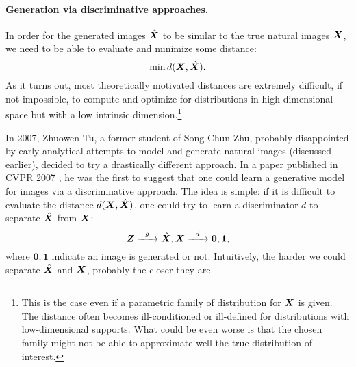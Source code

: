 \documentclass[\toplevelprefix/book-main.tex]{subfiles}
\begin{document}
\paragraph{Generation via discriminative approaches.}
In order for the generated images $\hat {\bm{X}}$ to be similar to the true natural images $\bm{X}$, we need to be able to evaluate and minimize some distance:
\begin{equation}
    \min d(\bm{X}, \hat {\bm{X}}).
\end{equation}
As it turns out, most theoretically motivated  distances are extremely difficult, if not impossible, to compute and optimize for distributions in high-dimensional space but with a low intrinsic dimension.\footnote{This is the case even if a parametric family of distribution for $\bm{X}$ is given. The distance often becomes ill-conditioned or ill-defined for distributions with low-dimensional supports. What could be even worse is that the chosen family might not be able to approximate well the true distribution of interest.} 

In 2007, Zhuowen Tu, a former student of Song-Chun Zhu, probably disappointed by early analytical attempts to model and generate natural images (discussed earlier), decided to try a drastically different approach. In a paper published in CVPR 2007 \cite{Tu-2007}, he was the first to suggest that one could learn a generative model for images via a discriminative approach. The idea is simple: if it is difficult to evaluate the distance $d(\bm{X}, \hat {\bm{X}})$, one could try to  learn a discriminator $d$ to separate $\hat {\bm{X}}$ from $\bm{X}$: 
\begin{equation}
    \bm{Z}   \xrightarrow{\hspace{2mm} g  \hspace{2mm}} \hat {\bm{X}}, \bm{X} \xrightarrow{\hspace{2mm} d  \hspace{2mm}} \boldsymbol{0}, \boldsymbol{1},
       \label{eqn:gan-networks}
\end{equation}
where $\boldsymbol{0}, \boldsymbol{1}$ indicate an image is generated or not.
Intuitively, the harder we could separate $\hat {\bm{X}}$ and   $\bm{X}$, probably the closer they are. 
\end{document}
